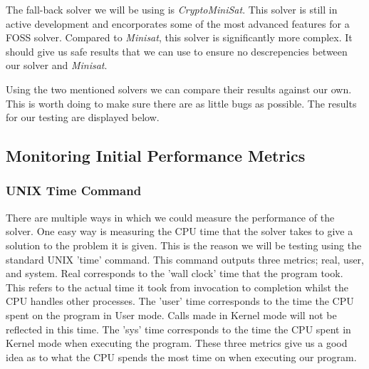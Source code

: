 \documentclass{article}
\begin{document}
The fall-back solver we will be using is \textit{CryptoMiniSat}. This solver is still in active
development and encorporates some of the most advanced features for a FOSS solver. Compared to
\textit{Minisat}, this solver is significantly more complex. It should give us safe results that we
can use to ensure no descrepencies between our solver and \textit{Minisat}.


Using the two mentioned solvers we can compare their results against our own. This is worth doing to make sure there are as 
little bugs as possible. The results for our testing are displayed below.


\subsection{Monitoring Initial Performance Metrics}

\subsubsection{UNIX Time Command}
There are multiple ways in which we could measure the performance of the solver. One easy way is
measuring the CPU time that the solver takes to give a solution to the problem it is given. This is
the reason we will be testing using the standard UNIX 'time' command. This command outputs three
metrics; real, user, and system. Real corresponds to the 'wall clock' time that the program took.
This refers to the actual time it took from invocation to completion whilst the CPU handles other
processes. The 'user' time corresponds to the time the CPU spent on the program in User mode. Calls
made in Kernel mode will not be reflected in this time. The 'sys' time corresponds to the time the
CPU spent in Kernel mode when executing the program. These three metrics give us a good idea as to
what the CPU spends the most time on when executing our program.
\end{document}
